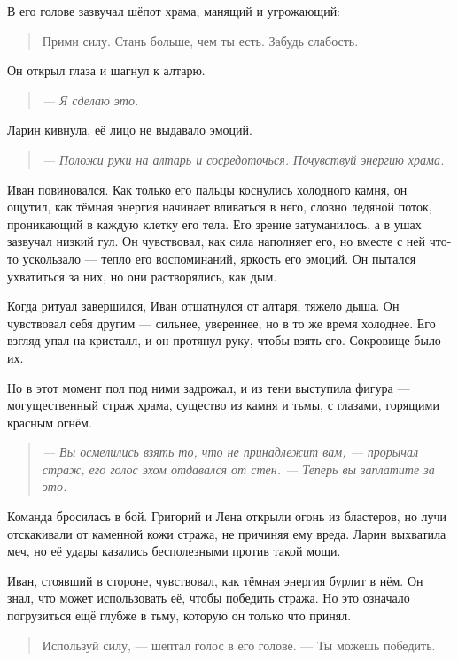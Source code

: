 \documentclass[12pt,a4paper]{book} %
\newenvironment{dialogue}{\begin{quote}\itshape}{\end{quote}}
\begin{document}
В его голове зазвучал шёпот храма, манящий и угрожающий:

\begin{quote}
Прими силу. Стань больше, чем ты есть. Забудь слабость.
\end{quote}

Он открыл глаза и шагнул к алтарю.

\begin{dialogue}
--- Я сделаю это.
\end{dialogue}

Ларин кивнула, её лицо не выдавало эмоций.

\begin{dialogue}
--- Положи руки на алтарь и сосредоточься. Почувствуй энергию храма.
\end{dialogue}

Иван повиновался. Как только его пальцы коснулись холодного камня, он ощутил, как тёмная энергия начинает вливаться в него, словно ледяной поток, проникающий в каждую клетку его тела. Его зрение затуманилось, а в ушах зазвучал низкий гул. Он чувствовал, как сила наполняет его, но вместе с ней что-то ускользало --- тепло его воспоминаний, яркость его эмоций. Он пытался ухватиться за них, но они растворялись, как дым.

Когда ритуал завершился, Иван отшатнулся от алтаря, тяжело дыша. Он чувствовал себя другим --- сильнее, увереннее, но в то же время холоднее. Его взгляд упал на кристалл, и он протянул руку, чтобы взять его. Сокровище было их.

Но в этот момент пол под ними задрожал, и из тени выступила фигура --- могущественный страж храма, существо из камня и тьмы, с глазами, горящими красным огнём.

\begin{dialogue}
--- Вы осмелились взять то, что не принадлежит вам, --- прорычал страж, его голос эхом отдавался от стен. --- Теперь вы заплатите за это.
\end{dialogue}

Команда бросилась в бой. Григорий и Лена открыли огонь из бластеров, но лучи отскакивали от каменной кожи стража, не причиняя ему вреда. Ларин выхватила меч, но её удары казались бесполезными против такой мощи.

Иван, стоявший в стороне, чувствовал, как тёмная энергия бурлит в нём. Он знал, что может использовать её, чтобы победить стража. Но это означало погрузиться ещё глубже в тьму, которую он только что принял.

\begin{quote}
Используй силу, --- шептал голос в его голове. --- Ты можешь победить.
\end{quote}
\end{document}
